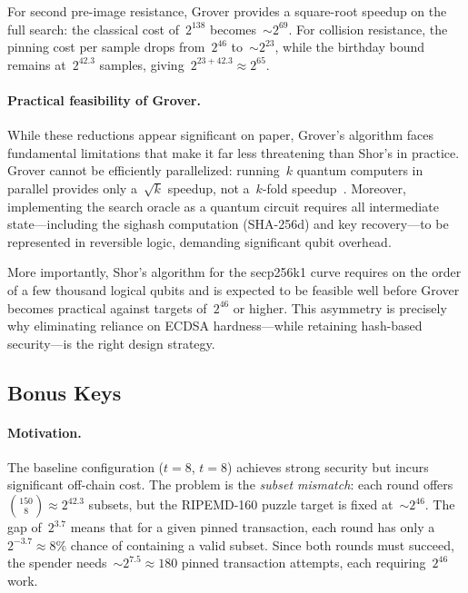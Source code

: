 \documentclass[11pt, a4paper]{article}
\begin{document}
\noindent For second pre-image resistance, Grover provides a square-root speedup on the full search: the classical cost of~$2^{138}$ becomes~${\sim}2^{69}$. For collision resistance, the pinning cost per sample drops from~$2^{46}$ to~${\sim}2^{23}$, while the birthday bound remains at~$2^{42.3}$ samples, giving~$2^{23 + 42.3} \approx 2^{65}$.

\paragraph{Practical feasibility of Grover.}
While these reductions appear significant on paper, Grover's algorithm faces fundamental limitations that make it far less threatening than Shor's in practice. Grover cannot be efficiently parallelized: running~$k$ quantum computers in parallel provides only a~$\sqrt{k}$ speedup, not a~$k$-fold speedup~\cite{grover1996}. Moreover, implementing the search oracle as a quantum circuit requires all intermediate state---including the sighash computation (SHA-256d) and key recovery---to be represented in reversible logic, demanding significant qubit overhead.

More importantly, Shor's algorithm for the secp256k1 curve requires on the order of a few thousand logical qubits and is expected to be feasible well before Grover becomes practical against targets of~$2^{46}$ or higher. This asymmetry is precisely why eliminating reliance on ECDSA hardness---while retaining hash-based security---is the right design strategy.

\subsection{Bonus Keys}
\label{sec:bonus-keys}

\paragraph{Motivation.}
The baseline configuration ($t = 8$, $t = 8$) achieves strong security but incurs significant off-chain cost. The problem is the \emph{subset mismatch}: each round offers $\binom{150}{8} \approx 2^{42.3}$ subsets, but the RIPEMD-160 puzzle target is fixed at~${\sim}2^{46}$. The gap of~$2^{3.7}$ means that for a given pinned transaction, each round has only a~$2^{-3.7} \approx 8\%$ chance of containing a valid subset. Since both rounds must succeed, the spender needs~${\sim}2^{7.5} \approx 180$ pinned transaction attempts, each requiring~$2^{46}$ work.
\end{document}
